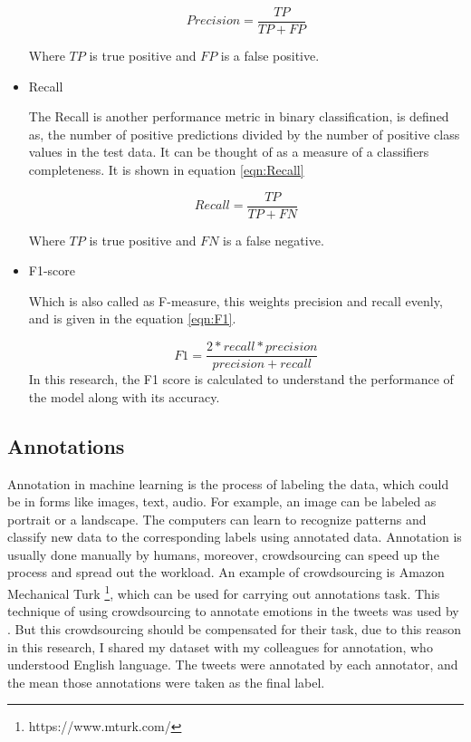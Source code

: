 \begin{itemize}
    \begin{equation}
    \label{eqn:Precision}
    Precision = \frac{TP}{TP + FP}
    \end{equation}
    
    Where $TP$ is true positive and $FP$ is a false positive.
    
    \item Recall
    
    The Recall is another performance metric in binary classification, is defined as, the number of positive predictions divided by the number of positive class values in the test data. It can be thought of as a measure of a classifiers completeness. It is shown in equation \ref{eqn:Recall} 
    
    \begin{equation}
        \label{eqn:Recall}
    Recall = \frac{TP}{TP + FN}
    \end{equation}
    
     Where $TP$ is true positive and $FN$ is a false negative.
    
    \item F1-score
   
    Which is also called as F-measure, this weights precision and recall evenly, and is given in the equation \ref{eqn:F1}.
    
        \begin{equation}
        \label{eqn:F1}
    F1 = \frac{2 * recall * precision}{precision + recall}
    \end{equation}
    In this research, the F1 score is calculated to understand the performance of the model along with its accuracy.
\end{itemize}

\subsection{Annotations}

Annotation in machine learning is the process of labeling the data, which could be in forms like images, text, audio. For example, an image can be labeled as portrait or a landscape. The computers can learn to recognize patterns and classify new data to the corresponding labels using annotated data. Annotation is usually done manually by humans, moreover, crowdsourcing can speed up the process and spread out the workload. An example of crowdsourcing is Amazon Mechanical Turk \footnote{https://www.mturk.com/}, which can be used for carrying out annotations task. This technique of using crowdsourcing to annotate emotions in the tweets was used by \cite{Mohammad:2010:EEC:1860631.1860635}. But this crowdsourcing should be compensated for their task, due to this reason in this research, I shared my dataset with my colleagues for annotation, who understood English language. The tweets were annotated by each annotator, and the mean those annotations were taken as the final label.  

